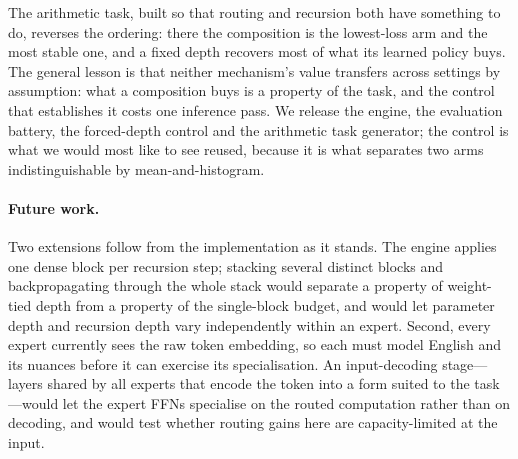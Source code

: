 The arithmetic task, built so that routing and recursion both have something to
do, reverses the ordering: there the composition is the lowest-loss arm and the
most stable one, and a fixed depth recovers most of what its learned policy buys.
The general lesson is that neither mechanism's value transfers across settings by
assumption: what a composition buys is a property of the task, and the control
that establishes it costs one inference pass. We release the engine, the
evaluation battery, the forced-depth control and the arithmetic task generator;
the control is what we would most like to see reused, because it is what
separates two arms indistinguishable by mean-and-histogram.

\paragraph{Future work.} Two extensions follow from the implementation as it
stands. The engine applies one dense block per recursion step; stacking several
distinct blocks and backpropagating through the whole stack would separate a
property of weight-tied depth from a property of the single-block budget, and
would let parameter depth and recursion depth vary independently within an
expert. Second, every expert currently sees the raw token embedding, so each must
model English and its nuances before it can exercise its specialisation. An
input-decoding stage---layers shared by all experts that encode the token into a
form suited to the task---would let the expert FFNs specialise on the routed
computation rather than on decoding, and would test whether routing gains here
are capacity-limited at the input.
